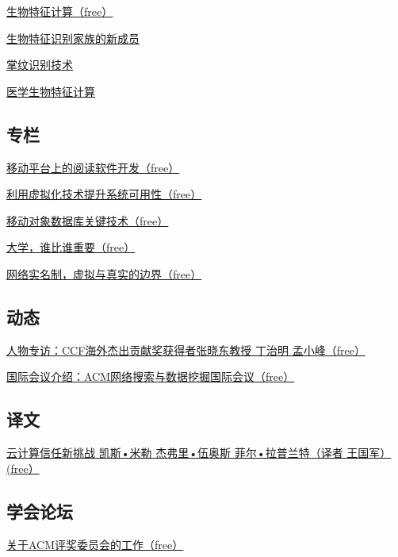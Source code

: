 \documentclass[a4paper]{article}
\begin{document}
\href{http://history.ccf.org.cn/resources/1190201776262/2011/05/17/1.pdf}{生物特征计算（free）}

\href{http://history.ccf.org.cn/resources/1190201776262/2011/05/17/3.pdf}{生物特征识别家族的新成员}

\href{http://history.ccf.org.cn/resources/1190201776262/2011/05/17/4.pdf}{掌纹识别技术}

\href{http://history.ccf.org.cn/resources/1190201776262/2011/05/17/5.pdf}{医学生物特征计算}

\subsection{专栏}
\href{http://history.ccf.org.cn/resources/1190201776262/2011/05/17/7.pdf}{移动平台上的阅读软件开发（free）}

\href{http://history.ccf.org.cn/resources/1190201776262/2011/05/17/8.pdf}{利用虚拟化技术提升系统可用性（free）}

\href{http://history.ccf.org.cn/resources/1190201776262/2011/05/17/9.pdf}{移动对象数据库关键技术（free）}

\href{http://history.ccf.org.cn/resources/1190201776262/2011/05/17/10.pdf}{大学，谁比谁重要（free）}

\href{http://history.ccf.org.cn/resources/1190201776262/2011/05/17/11.pdf}{网络实名制，虚拟与真实的边界（free）}

\subsection{动态}
\href{http://history.ccf.org.cn/resources/1190201776262/2011/05/17/12.pdf}{人物专访：CCF海外杰出贡献奖获得者张晓东教授 丁治明   孟小峰（free）}

\href{http://history.ccf.org.cn/resources/1190201776262/2011/05/17/13.pdf}{国际会议介绍：ACM网络搜索与数据挖掘国际会议（free）}

\subsection{译文}
\href{http://history.ccf.org.cn/resources/1190201776262/2011/05/17/14.pdf}{云计算信任新挑战 凯斯•米勒   杰弗里•伍奥斯   菲尔•拉普兰特（译者  王国军）  (free）}

\subsection{学会论坛}
\href{http://history.ccf.org.cn/resources/1190201776262/2011/05/17/16.pdf}{关于ACM评奖委员会的工作（free）}
\end{document}
